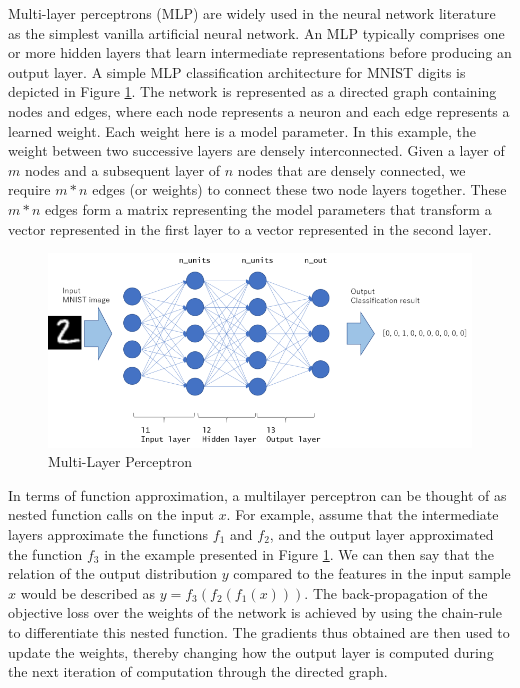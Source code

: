 Multi-layer perceptrons (MLP) are widely used in the neural network literature as the simplest vanilla artificial neural network. An MLP typically comprises one or more hidden layers that learn intermediate representations before producing an output layer. A simple MLP classification architecture for MNIST digits \citep{lecun2010mnist} \citep{deng2012mnist} is depicted in Figure \ref{fig:mlp-network}. The network is represented as a directed graph containing nodes and edges, where each node represents a neuron and each edge represents a learned weight. Each weight here is a model parameter. In this example, the weight between two successive layers are densely interconnected. Given a layer of $m$ nodes and a subsequent layer of $n$ nodes that are densely connected, we require $m*n$ edges (or weights) to connect these two node layers together. These $m*n$ edges form a matrix representing the model parameters that transform a vector represented in the first layer to a vector represented in the second layer.

\begin{figure}[ht]
	\centering
	\includegraphics[width=\textwidth]{images/mlp-network}
	\caption{\label{fig:mlp-network} Multi-Layer Perceptron}
\end{figure}

In terms of function approximation, a multilayer perceptron can be thought of as nested function calls on the input $x$. For example, assume that the intermediate layers approximate the functions $f_1$ and $f_2$, and the output layer approximated the function $f_3$ in the example presented in Figure \ref{fig:mlp-network}. We can then say that the relation of the output distribution $y$ compared to the features in the input sample $x$ would be described as $y = f_3(f_2(f_1(x)))$. The back-propagation of the objective loss over the weights of the network is achieved by using the chain-rule to differentiate this nested function. The gradients thus obtained are then used to update the weights, thereby changing how the output layer is computed \citep{lecun1989backpropagation} during the next iteration of computation through the directed graph.

